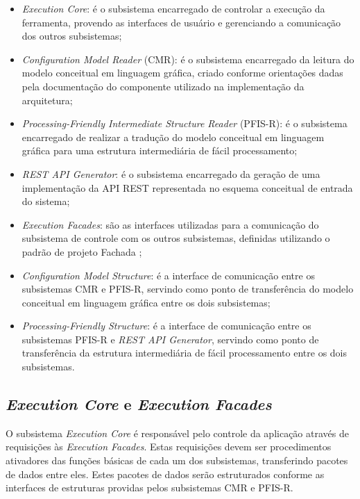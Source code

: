 \begin{itemize}
    \item \textit{Execution Core}: é o subsistema encarregado de controlar a execução da ferramenta, provendo as interfaces de usuário e gerenciando a comunicação dos outros subsistemas; 
    \item \textit{Configuration Model Reader} (CMR): é o subsistema encarregado da leitura do modelo conceitual em linguagem gráfica, criado conforme orientações dadas pela documentação do componente utilizado na implementação da arquitetura;
    \item \textit{Processing-Friendly Intermediate Structure Reader} (PFIS-R): é o subsistema encarregado de realizar a tradução do modelo conceitual em linguagem gráfica para uma estrutura intermediária de fácil processamento;
    \item \textit{REST API Generator}: é o subsistema encarregado da geração de uma implementação da API REST representada no esquema conceitual de entrada do sistema;
    \item \textit{Execution Facades}: são as interfaces utilizadas para a comunicação do subsistema de controle com os outros subsistemas, definidas utilizando o padrão de projeto Fachada \cite{GAMMA:1995};
    \item \textit{Configuration Model Structure}: é a interface de comunicação entre os subsistemas CMR e PFIS-R, servindo como ponto de transferência do modelo conceitual em linguagem gráfica entre os dois subsistemas;
    \item \textit{Processing-Friendly Structure}: é a interface de comunicação entre os subsistemas PFIS-R e \textit{REST API Generator}, servindo como ponto de transferência da estrutura intermediária de fácil processamento entre os dois subsistemas.
\end{itemize}


\subsection{\textit{Execution Core} e \textit{Execution Facades}}

O subsistema \textit{Execution Core} é responsável pelo controle da aplicação através de requisições às \textit{Execution Facades}. Estas requisições devem ser procedimentos ativadores das funções básicas de cada um dos subsistemas, transferindo pacotes de dados entre eles. Estes pacotes de dados serão estruturados conforme as interfaces de estruturas providas pelos subsistemas CMR e PFIS-R.

